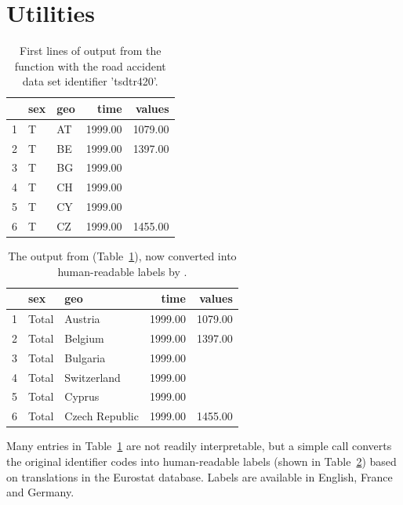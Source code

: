 \section{Utilities}

\begin{table}[ht!]
\centering
\begin{tabular}{rllrr}
\toprule
  \hline
  & sex & geo & time & values \\ 
  \hline
  1 & T & AT & 1999.00 & 1079.00 \\ 
  2 & T & BE & 1999.00 & 1397.00 \\ 
  3 & T & BG & 1999.00 &  \\ 
  4 & T & CH & 1999.00 &  \\ 
  5 & T & CY & 1999.00 &  \\ 
  6 & T & CZ & 1999.00 & 1455.00 \\ 
   \hline
\bottomrule      
\end{tabular}
\caption{First lines of output from the  function with the road accident data set identifier 'tsdtr420'.}
\label{tab:getdatatable}
\end{table}


\begin{table}[hb!]
\centering
\begin{tabular}{rllrr}
\toprule
  \hline
  & sex & geo & time & values \\ 
  \hline
  1 & Total & Austria & 1999.00 & 1079.00 \\ 
  2 & Total & Belgium & 1999.00 & 1397.00 \\ 
  3 & Total & Bulgaria & 1999.00 &  \\ 
  4 & Total & Switzerland & 1999.00 &  \\ 
  5 & Total & Cyprus & 1999.00 &  \\ 
  6 & Total & Czech Republic & 1999.00 & 1455.00 \\ 
   \hline
\bottomrule   
\end{tabular}
\caption{The output from  (Table~\ref{tab:getdatatable}), now converted into human-readable labels by .}
\label{tab:getdatatable2}
\end{table}

Many entries in Table~\ref{tab:getdatatable} are not readily
interpretable, but a simple call  converts
the original identifier codes into human-readable labels (shown in
Table~\ref{tab:getdatatable2}) based on translations in the Eurostat
database. Labels are available in English, France and Germany.

